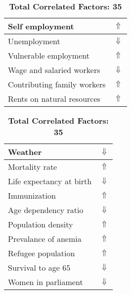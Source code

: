 \documentclass[12pt,notitlepage,oneside]{report}
\begin{document}
\begin{table}[!htb]
\begin{tabular}{|l|l|}
Self employment & $\Uparrow$\\ \hline
Unemployment & $\Downarrow$\\ \hline
Vulnerable employment & $\Uparrow$\\ \hline
Wage and salaried workers & $\Downarrow$\\ \hline
Contributing family workers & $\Uparrow$\\ \hline
Rents on natural resources & $\Uparrow$\\ \hline
\end{tabular}
\begin{tabular}{|l|l|}
\hline
Weather & $\Downarrow$\\ \hline
Mortality rate & $\Uparrow$\\ \hline
Life expectancy at birth & $\Downarrow$\\ \hline
Immunization & $\Uparrow$\\ \hline
Age dependency ratio & $\Downarrow$\\ \hline
Population density & $\Uparrow$\\ \hline
Prevalance of anemia & $\Uparrow$\\ \hline
Refugee population & $\Uparrow$\\ \hline
Survival to age 65 & $\Downarrow$\\ \hline
Women in parliament & $\Downarrow$\\ \hline
\end{tabular}
\caption*{\textbf{Total Correlated Factors: 35}}
\end{table}
\clearpage
\end{document}
